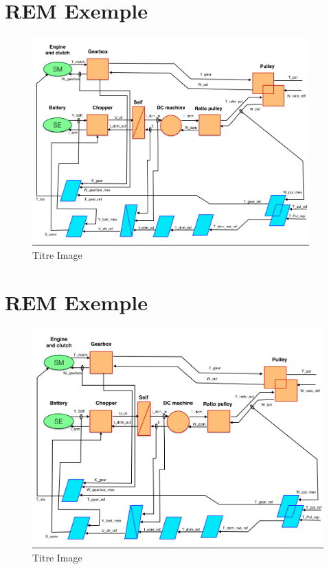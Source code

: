 	\appendix
	\appendixpage
	\addappheadtotoc
\section{REM Exemple}\FloatBarrier
\begin{figure}[ht]
\begin{center}
	\includegraphics[width=0.95\textwidth,angle=90]{images/REM1.png}
	\caption{Titre Image}\label{img:labelImg}
\end{center}
\end{figure}
\FloatBarrier


\section{REM Exemple}\FloatBarrier
\begin{figure}
\begin{center}
	\includegraphics[width=1.1\textwidth,angle=0]{images/REM1.png}
	\caption{Titre Image}\label{img:labelImg}
\end{center}
\end{figure}
\FloatBarrier